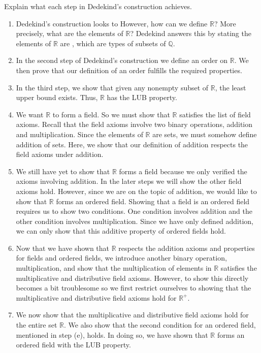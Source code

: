\documentclass[12pt]{article}
\begin{document}
\problem 
Explain what each step in Dedekind's construction achieves.
\begin{enumerate}
\item Dedekind's construction looks to  However, how can we define $\mathbb{R}$? More precisely, what are the elements of $\mathbb{R}$? Dedekind answers this by stating the elements of $\mathbb{R}$ are , which are types of subsets of $\mathbb{Q}$.
\item In the second step of Dedekind's construction we define an order on $\mathbb{R}$. We then prove that our definition of an order fulfills the required properties. 
\item In the third step, we show that given any nonempty subset of $\mathbb{R}$, the least upper bound exists. Thus, $\mathbb{R}$ has the LUB property.
\item We want $\mathbb{R}$ to form a field. So we must show that $\mathbb{R}$ satisfies the list of field axioms. Recall that the field axioms involve two binary operations, addition and multiplication. Since the elements of $\mathbb{R}$ are sets, we must somehow define addition of sets. Here, we show that our definition of addition respects the field axioms under addition.
\item We still have yet to show that $\mathbb{R}$ forms a field because we only verified the axioms involving addition. In the later steps we will show the other field axioms hold. However, since we are on the topic of addition, we would like to show that $\mathbb{R}$ forms an ordered field. Showing that a field is an ordered field requires us to show two conditions. One condition involves addition and the other condition involves multiplication. Since we have only defined addition, we can only show that this additive property of ordered fields hold. 
\item Now that we have shown that $\mathbb{R}$ respects the addition axioms and properties for fields and ordered fields, we introduce another binary operation, multiplication, and show that the multiplication of elements in $\mathbb{R}$ satisfies the multiplicative and distributive field axioms. However, to show this directly becomes a bit troublesome so we first restrict ourselves to showing that the multiplicative and distributive field axioms hold for $\mathbb{R^{+}}$.
\item We now show that the multiplicative and distributive field axioms hold for the entire set $\mathbb{R}$. We also show that the second condition for an ordered field, mentioned in step (e), holds. In doing so, we have shown that $\mathbb{R}$ forms an ordered field with the LUB property.

\end{enumerate}
\end{document}
